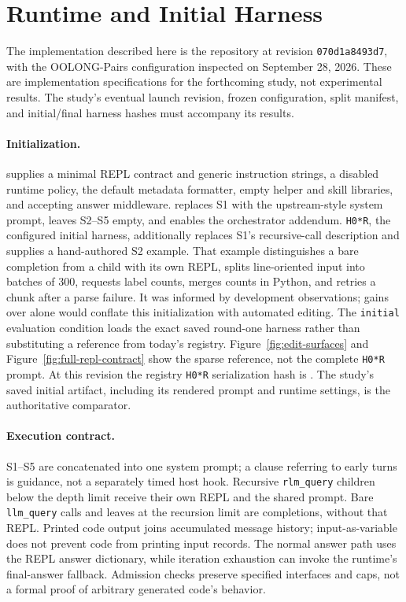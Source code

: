 \section{Runtime and Initial Harness}
\label{app:surfaces}

The implementation described here is the repository at revision
\texttt{070d1a8493d7}, with the OOLONG-Pairs configuration inspected on
September 28, 2026. These are implementation specifications for the forthcoming
study, not experimental results. The study's eventual launch revision, frozen
configuration, split manifest, and initial/final harness hashes must accompany
its results.

\paragraph{Initialization.}
\hzero{} supplies a minimal REPL contract and generic instruction strings, a
disabled runtime policy, the default metadata formatter, empty helper and skill
libraries, and accepting answer middleware. \hzerostar{} replaces S1 with the
upstream-style system prompt, leaves S2--S5 empty, and enables the orchestrator
addendum. \texttt{H0*R}, the configured initial harness, additionally replaces
S1's recursive-call description and supplies a hand-authored S2 example. That
example distinguishes a bare completion from a child with its own REPL, splits
line-oriented input into batches of 300, requests label counts, merges counts in
Python, and retries a chunk after a parse failure. It was informed by development
observations; gains over \hzero{} alone would conflate this initialization with
automated editing. The \texttt{initial} evaluation condition loads the exact
saved round-one harness rather than substituting a reference from today's
registry. Figure~\ref{fig:edit-surfaces} and Figure~\ref{fig:full-repl-contract}
show the sparse reference, not the complete \texttt{H0*R} prompt.
At this revision the registry \texttt{H0*R} serialization hash is
.
The study's saved initial artifact, including its rendered prompt and runtime
settings, is the authoritative comparator.

\paragraph{Execution contract.}
S1--S5 are concatenated into one system prompt; a clause referring to early turns
is guidance, not a separately timed host hook. Recursive \texttt{rlm\_query}
children below the depth limit receive their own REPL and the shared prompt.
Bare \texttt{llm\_query} calls and leaves at the recursion limit are completions,
without that REPL. Printed code output joins accumulated message history;
input-as-variable does not prevent code from printing input records. The normal
answer path uses the REPL answer dictionary, while iteration exhaustion can
invoke the runtime's final-answer fallback. Admission checks preserve specified
interfaces and caps, not a formal proof of arbitrary generated code's behavior.

